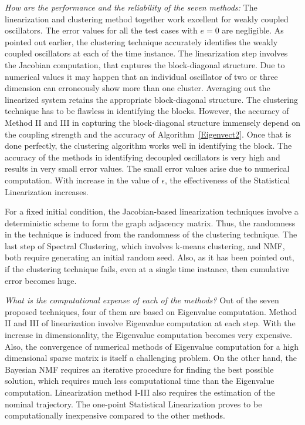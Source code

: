 \textit{How are the performance and the reliability of the seven methods:} The linearization and clustering method together work excellent for weakly coupled oscillators. The error values for all the test cases with $e = 0$ are negligible. As pointed out earlier, the clustering technique accurately identifies the weakly coupled oscillators at each of the time instance. The linearization step involves the Jacobian computation, that captures the block-diagonal structure. Due to numerical values it may happen that an individual oscillator of two or three dimension can erroneously show more than one cluster. Averaging out the linearized system retains the appropriate block-diagonal structure. The clustering technique has to be flawless in identifying the blocks. However, the accuracy of Method II and III in capturing the block-diagonal structure immensely depend on the coupling strength and the accuracy of Algorithm~\ref{Eigenvect2}. Once that is done perfectly, the clustering algorithm works well in identifying the block. The accuracy of the methods in identifying decoupled oscillators is very high and results in very small error values. The small error values arise due to numerical computation. With increase in the value of $\epsilon$, the effectiveness of the Statistical Linearization increases. 

For a fixed initial condition, the Jacobian-based linearization techniques involve a deterministic scheme to form the graph adjacency matrix. Thus, the randomness in the technique is induced from the randomness of the clustering technique. The last step of Spectral Clustering, which involves k-means clustering, and NMF, both require generating an initial random seed. Also, as it has been pointed out, if the clustering technique fails, even at a single time instance, then cumulative error becomes huge. 

\textit{What is the computational expense of each of the methods?} Out of the seven proposed techniques, four of them are based on Eigenvalue computation. Method II and III of linearization involve Eigenvalue computation at each step. With the increase in dimensionality, the Eigenvalue computation becomes very expensive. Also, the convergence of numerical methods of Eigenvalue computation for a high dimensional sparse matrix is itself a challenging problem. On the other hand, the Bayesian NMF requires an iterative procedure for finding the best possible solution, which requires much less computational time than the Eigenvalue computation. Linearization method I-III also requires the estimation of the nominal trajectory. The one-point Statistical Linearization proves to be computationally inexpensive compared to the other methods. 

